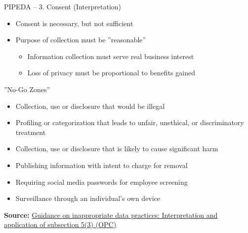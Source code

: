 \documentclass[ignorenonframetext,xcolor=x11names]{beamer}
\begin{document}
\begin{frame}{PIPEDA -- 3. Consent \small (Interpretation)}
\begin{itemize}
   \item Consent is necessary, but not sufficient
   \item Purpose of collection must be ''reasonable''
   \begin{itemize}
   \item Information collection must serve real business interest
   \item Loss of privacy must be proportional to benefits gained
   \end{itemize}
\end{itemize}
\begin{block}{''No-Go Zones''}
\begin{itemize}
   \item Collection, use or disclosure that would be illegal
   \item Profiling or categorization that leads to unfair, unethical, or discriminatory treatment
   \item Collection, use or disclosure that is likely to cause significant harm
   \item Publishing information with intent to charge for removal
   \item Requiring social media passwords for employee screening
   \item Surveillance through an individual's own device
\end{itemize}
\end{block}

\vspace{.5\baselineskip}
\scriptsize \textbf{Source:} \href{https://www.priv.gc.ca/en/privacy-topics/collecting-personal-information/consent/gd_53_201805/}{Guidance on inappropriate data practices: Interpretation and application of subsection 5(3) (OPC)}
\end{frame}
\end{document}
